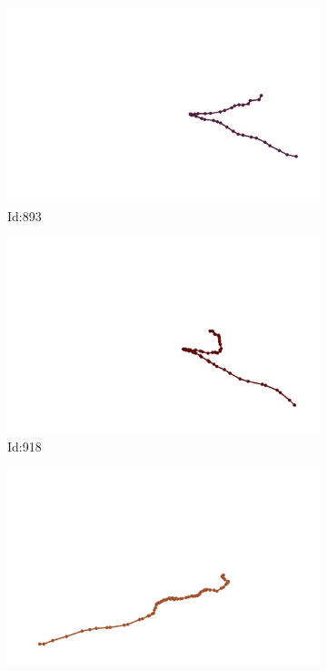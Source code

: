 \documentclass[12pt,twoside]{report}
\begin{document}
\begin{figure}
\begin{subfigure}[b]{0.20\textwidth}
\centering
\includegraphics[width=\textwidth]{../trajectories/893.png}
\caption{Id:893}
\end{subfigure}
\begin{subfigure}[b]{0.20\textwidth}
\centering
\includegraphics[width=\textwidth]{../trajectories/918.png}
\caption{Id:918}
\end{subfigure}
\begin{subfigure}[b]{0.20\textwidth}
\centering
\includegraphics[width=\textwidth]{../trajectories/922.png}

\end{subfigure}
\end{figure}
\end{document}
